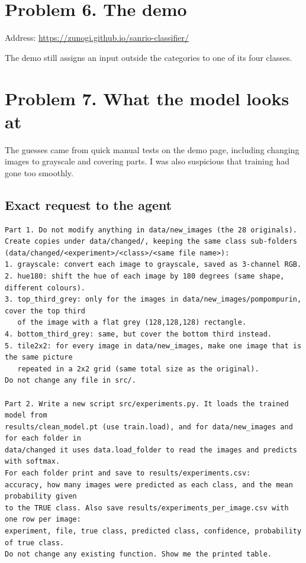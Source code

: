 \documentclass[11pt]{article}
\begin{document}
\section*{Problem 6. The demo}

Address: \url{https://zunogi.github.io/sanrio-classifier/}

The demo still assigns an input outside the categories to one of its four
classes.

\section*{Problem 7. What the model looks at}

The guesses came from quick manual tests on the demo page, including changing
images to grayscale and covering parts. I was also suspicious that training
had gone too smoothly.

\subsection*{Exact request to the agent}
\begin{Verbatim}[fontsize=\footnotesize,breaklines]
Part 1. Do not modify anything in data/new_images (the 28 originals).
Create copies under data/changed/, keeping the same class sub-folders
(data/changed/<experiment>/<class>/<same file name>):
1. grayscale: convert each image to grayscale, saved as 3-channel RGB.
2. hue180: shift the hue of each image by 180 degrees (same shape, different colours).
3. top_third_grey: only for the images in data/new_images/pompompurin, cover the top third
   of the image with a flat grey (128,128,128) rectangle.
4. bottom_third_grey: same, but cover the bottom third instead.
5. tile2x2: for every image in data/new_images, make one image that is the same picture
   repeated in a 2x2 grid (same total size as the original).
Do not change any file in src/.

Part 2. Write a new script src/experiments.py. It loads the trained model from
results/clean_model.pt (use train.load), and for data/new_images and for each folder in
data/changed it uses data.load_folder to read the images and predicts with softmax.
For each folder print and save to results/experiments.csv:
accuracy, how many images were predicted as each class, and the mean probability given
to the TRUE class. Also save results/experiments_per_image.csv with one row per image:
experiment, file, true class, predicted class, confidence, probability of true class.
Do not change any existing function. Show me the printed table.
\end{Verbatim}
\end{document}
